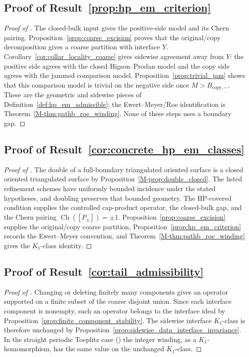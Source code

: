 \documentclass[11pt]{article}
\numberwithin{equation}{section}
\theoremstyle{definition}
\theoremstyle{remark}
\newcommand{\Ch}{\operatorname{Ch}}
\begin{document}
\subsection{Proof of Result~\ref{prop:hp_em_criterion}}\label{app:proof:prop:hp_em_criterion}
\begin{proof}[Proof of ]
The closed-bulk input gives the positive-side model and its Chern pairing.
Proposition~\ref{prop:coarse_excision} proves that the original/copy decomposition gives a coarse
partition with interface \(Y\). Corollary~\ref{cor:collar_locality_coarse} gives sidewise agreement
away from \(Y\): the positive side agrees with the closed Higson--Prodan model and the copy side
agrees with the jammed comparison model. Proposition~\ref{prop:trivial_jam} shows that this
comparison model is trivial on the negative side once \(M>B_{\mathrm{copy},-}\). These are the
geometric and sidewise pieces of Definition~\ref{def:hp_em_admissible}; the Ewert--Meyer/Roe
identification is Theorem~\ref{M-thm:pathb_roe_winding}. None of these steps uses a boundary gap.
\end{proof}

\subsection{Proof of Result~\ref{cor:concrete_hp_em_classes}}\label{app:proof:cor:concrete_hp_em_classes}
\begin{proof}[Proof of ]
The double of a full-boundary triangulated oriented surface is a closed oriented triangulated
surface by Proposition~\ref{M-prop:double_closed}. The listed refinement schemes have uniformly
bounded incidence under the stated hypotheses, and doubling preserves that bounded geometry. The
HP-covered condition supplies the controlled cap-product operator, the closed-bulk gap, and the
Chern pairing \(\Ch([P_\pm])=\pm1\). Proposition~\ref{prop:coarse_excision} supplies the
original/copy coarse partition, Proposition~\ref{prop:hp_em_criterion} records the Ewert--Meyer
convention, and Theorem~\ref{M-thm:pathb_roe_winding} gives the \(K_1\)-class identity.
\end{proof}

\subsection{Proof of Result~\ref{cor:tail_admissibility}}\label{app:proof:cor:tail_admissibility}
\begin{proof}[Proof of ]
Changing or deleting finitely many components gives an operator supported on a finite subset of
the coarse disjoint union. Since each interface component is nonempty, such an operator belongs to
the interface ideal by Proposition~\ref{prop:finite_component_stability}. The sidewise interface
\(K_1\)-class is therefore unchanged by Proposition~\ref{prop:sidewise_data_interface_invariance}.
In the straight periodic Toeplitz case () the integer winding,
as a \(K_1\)-homomorphism, has the same value on the unchanged \(K_1\)-class.
\end{proof}
\end{document}
